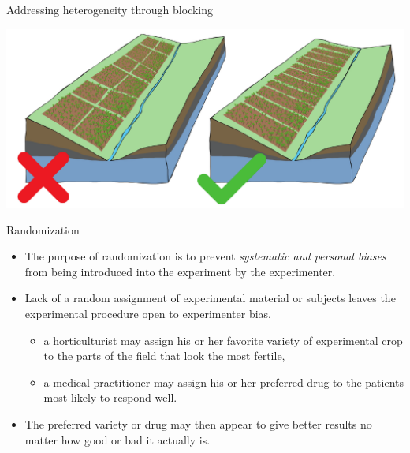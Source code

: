\documentclass[
  ignorenonframetext,
  aspectratio=169]{beamer}
\providecommand{\tightlist}{%
  \setlength{\itemsep}{0pt}\setlength{\parskip}{0pt}}
\begin{document}
\begin{frame}{Addressing heterogeneity through blocking}
\protect\hypertarget{addressing-heterogeneity-through-blocking}{}
\begin{center}\includegraphics[width=0.95\linewidth]{./images/blocking_concept} \end{center}
\end{frame}

\begin{frame}{Randomization}
\protect\hypertarget{randomization}{}
\begin{itemize}[<+->]
\tightlist
\item
  The purpose of randomization is to prevent \emph{systematic and
  personal biases} from being introduced into the experiment by the
  experimenter.
\end{itemize}

\begin{itemize}[<+->]
\tightlist
\item
  Lack of a random assignment of experimental material or subjects
  leaves the experimental procedure open to \alert{experimenter bias}.

  \begin{itemize}[<+->]
  \tightlist
  \item
    a horticulturist may assign his or her favorite variety of
    experimental crop to the parts of the field that look the most
    fertile,
  \item
    a medical practitioner may assign his or her preferred drug to the
    patients most likely to respond well.
  \end{itemize}
\item
  The preferred variety or drug may then appear to give better results
  no matter how good or bad it actually is.
\end{itemize}
\end{frame}
\end{document}
